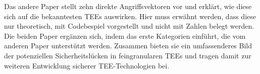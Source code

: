 Das andere Paper stellt zehn direkte Angriffsvektoren vor und erklärt, wie diese sich auf die bekanntesten TEEs auswirken. Hier muss erwähnt werden, dass diese nur theoretisch, mit Codebespiel vorgestellt und nicht mit Zahlen belegt werden.
Die beiden Paper ergänzen sich, indem das erste Kategorien einführt, die vom anderen Paper unterstützt werden. Zusammen bieten sie ein umfassenderes Bild der potenziellen Sicherheitslücken in feingranularen TEEs und tragen damit zur weiteren Entwicklung sicherer TEE-Technologien bei. 
